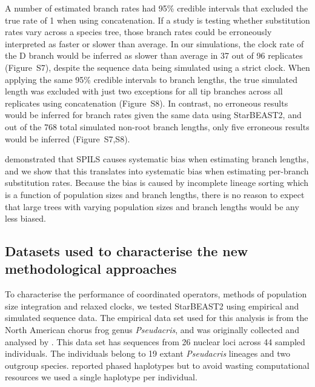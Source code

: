 \documentclass[nogrid]{MBE}%
\begin{document}
A number of estimated branch rates had 95\% credible intervals that excluded
the true rate of 1 when using concatenation. If a study is testing whether
substitution rates vary across a species tree, those branch rates could be
erroneously interpreted as faster or slower than average. In our simulations,
the clock rate of the D branch would be inferred as slower than average in 37
out of 96 replicates (Figure~S7), despite the sequence data being simulated
using a strict clock. When applying the same 95\% credible intervals to branch
lengths, the true simulated length was excluded with just two exceptions for
all tip branches across all replicates using concatenation (Figure~S8). In
contrast, no erroneous results would be inferred for branch rates given the
same data using StarBEAST2, and out of the 768 total simulated non-root branch
lengths, only five erroneous results would be inferred (Figure~S7,S8).

\cite{Mendes01072016} demonstrated that SPILS causes systematic bias when
estimating branch lengths, and we show that this translates into systematic
bias when estimating per-branch substitution rates. Because the bias is caused
by incomplete lineage sorting which is a function of population sizes and
branch lengths, there is no reason to expect that large trees with varying
population sizes and branch lengths would be any less biased.

\subsection{Datasets used to characterise the new methodological approaches}

To characterise the performance of coordinated operators, methods of
population size integration and relaxed clocks, we tested StarBEAST2 using
empirical and simulated sequence data. The empirical data set used for this
analysis is from the North American chorus frog genus \textit{Pseudacris}, and
was originally collected and analysed by \cite{Barrow201478}. This data set
has sequences from 26 nuclear loci across 44 sampled individuals. The individuals
belong to 19 extant \textit{Pseudacris} lineages and two outgroup species.
\cite{Barrow201478} reported phased haplotypes but to avoid wasting
computational resources we used a single haplotype per individual.
\end{document}
